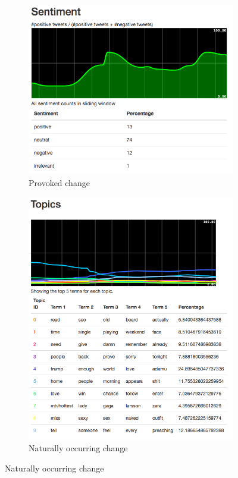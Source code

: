 \begin{figure}
    \centering
    \caption{Sentiment and topic chart}
    \label{fig:dasboard}
    \begin{subfigure}[t]{0.485\textwidth}
        \centering
        \caption{Provoked change}
        \label{fig:dashboard-sentiment}
        \includegraphics[width=\textwidth]{../images/dashboard_sentiment.png}
    \end{subfigure}
    \begin{subfigure}[t]{0.505\textwidth}
        \centering
        \caption{Naturally occurring change}
        \label{fig:dashboard-topics}
        \includegraphics[width=\textwidth]{../images/dashboard_topics.png}
    \end{subfigure}
\end{figure}

